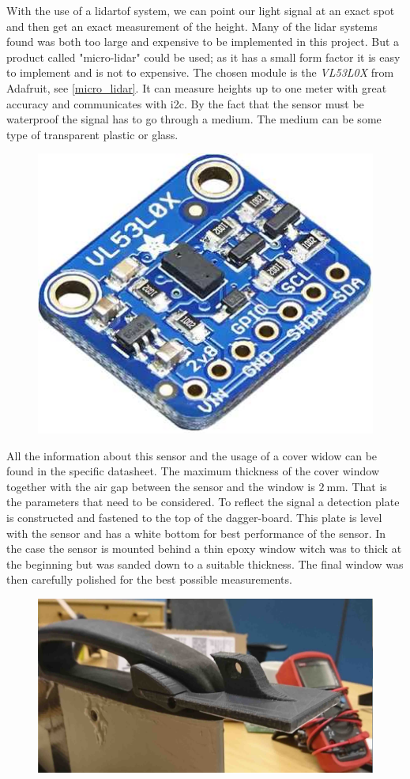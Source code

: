 With the use of a \gls{lidar}\gls{tof} system, we can point our light signal at an exact spot and then get an exact measurement of the height.  
Many of the \gls{lidar} systems found was both too large and expensive to be implemented in this project.
But a product called "micro-lidar" could be used; as it has a small form factor it is easy to implement and is not to expensive.
The chosen module is the \emph{VL53L0X} from Adafruit\cite{micro_lidar}, see \autoref{micro_lidar}. It can measure heights up to one meter with great accuracy and communicates with \gls{i2c}.
By the fact that the sensor must be waterproof the signal has to go through a medium. The medium can be some type of transparent plastic or glass.
\begin{figure}[H]
	\centering
	\includegraphics[width = .45\textwidth]{Figures/Adafruit_height_sensor.jpg}
	\label{micro_lidar}
\end{figure}

All the information about this sensor and the usage of a cover widow can be found in the specific datasheet\cite{Tof_cover}. The maximum thickness of the cover window together with the air gap between the sensor and the window is $2~\textrm{mm}$. That is the parameters that need to be considered. To reflect the signal a detection plate is constructed and fastened to the top of the dagger-board. This plate is level with the sensor and has a white bottom for best performance of the sensor. In the case the sensor is mounted behind a thin epoxy window witch was to thick at the beginning but was sanded down to a suitable thickness. The final window was then carefully polished for the best possible measurements. 

\begin{figure}[H]
	\centering
	\includegraphics[width = .8\textwidth]{Figures/height_measure.jpg}
	\label{height_measure}
\end{figure}


